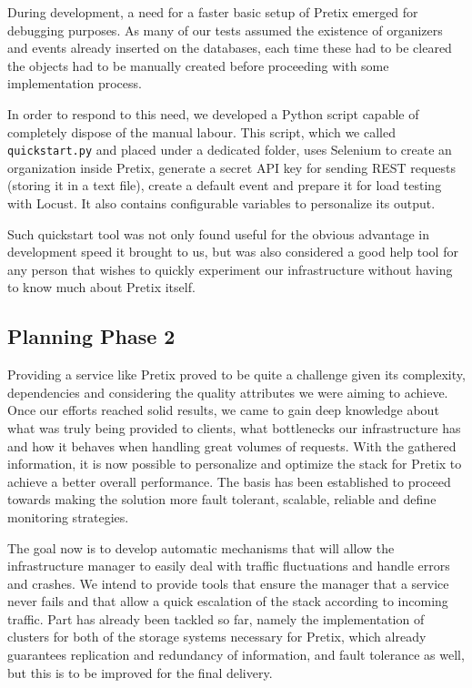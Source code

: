 \documentclass[12pt]{article}
\begin{document}

During development, a need for a faster basic setup of Pretix emerged for debugging purposes.
As many of our tests assumed the existence of organizers and events already inserted on the databases, each time these had to be cleared the objects had to be 
manually created before proceeding with some implementation process.

In order to respond to this need, we developed a Python script capable of completely dispose of the manual labour.
This script, which we called \texttt{quickstart.py} and placed under a dedicated folder, uses Selenium \cite{selenium} to create an organization inside Pretix, 
generate a secret API key for sending REST requests (storing it in a text file), create a default event and prepare it for load testing with Locust.
It also contains configurable variables to personalize its output.

Such quickstart tool was not only found useful for the obvious advantage in development speed it brought to us, but was also considered a good help tool for any 
person that wishes to quickly experiment our infrastructure without having to know much about Pretix itself.

\subsection{Planning Phase 2} \label{remarks.planning} %


Providing a service like Pretix proved to be quite a challenge given its complexity, dependencies and considering the quality attributes we were aiming to achieve.
Once our efforts reached solid results, we came to gain deep knowledge about what was truly being provided to clients, what bottlenecks our infrastructure has 
and how it behaves when handling great volumes of requests.
With the gathered information, it is now possible to personalize and optimize the stack for Pretix to achieve a better overall performance.
The basis has been established to proceed towards making the solution more fault tolerant, scalable, reliable and define monitoring strategies.

The goal now is to develop automatic mechanisms that will allow the infrastructure manager to easily deal with traffic fluctuations and handle errors and crashes.
We intend to provide tools that ensure the manager that a service never fails and that allow a quick escalation of the stack according to incoming traffic.
Part has already been tackled so far, namely the implementation of clusters for both of the storage systems necessary for Pretix, which already guarantees 
replication and redundancy of information, and fault tolerance as well, but this is to be improved for the final delivery.
\end{document}
